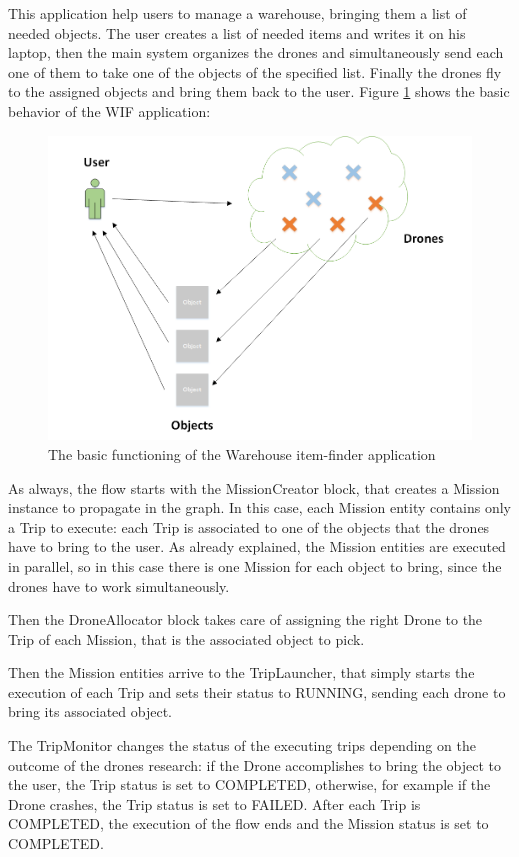 This application help users to manage a warehouse, bringing them a list of needed objects.
The user creates a list of needed items and writes it on his laptop, then
the main system organizes the drones and simultaneously send each one of them to take one of the objects of the specified list.
Finally the drones fly to the assigned objects and bring them back to the user.
Figure \ref{fig:WIS} shows the basic behavior of the WIF application:

\begin{figure}[H]
  \centering
  \includegraphics[width=\linewidth]{pictures/WIF.png}
  \caption{The basic functioning of the Warehouse item-finder application}
  \label{fig:WIS}
\end{figure}

As always, the flow starts with the MissionCreator block, that creates a Mission instance to propagate in the graph.
In this case, each Mission entity contains only a Trip to execute:
each Trip is associated to one of the objects that the drones have to bring to the user.
As already explained, the Mission entities are executed in parallel, so in this case
there is one Mission for each object to bring, since the drones have to work simultaneously.

Then the DroneAllocator block takes care of assigning the right Drone to the Trip of each Mission, that is the associated object to pick.

Then the Mission entities arrive to the TripLauncher, that simply starts the execution of each Trip and sets their status to RUNNING, sending each drone to bring its associated object.

The TripMonitor changes the status of the executing trips depending on the outcome of the drones research:
if the Drone accomplishes to bring the object to the user, the Trip status is set to COMPLETED, otherwise, for example if the Drone crashes, the Trip status is set to FAILED.
After each Trip is COMPLETED, the execution of the flow ends and the Mission status is set to COMPLETED.
\\


